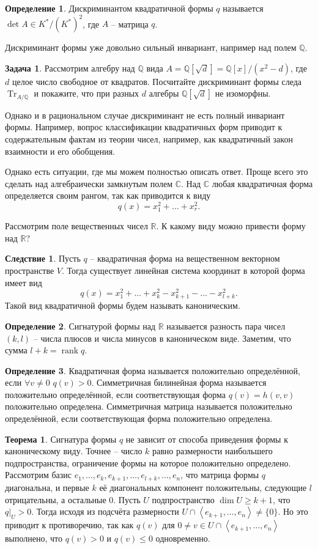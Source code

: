 \documentclass[10pt,a4paper,oneside]{book}
\theoremstyle{definition}
\newtheorem{zad}{Задача}
\newtheorem*{defn}{Определение}
\newtheorem{thm}{Теорема}
\newtheorem{cor}{Следствие}
\newcommand{\mb}[1]{\mathbb{#1}}
\newcommand{\rank}{\operatorname{rank}}
\newcommand{\tr}{\operatorname{Tr}}
\def\lan{\left\langle }
\def\ran{\right\rangle}
\def\thrm{\begin{thm}}
\def\ethrm{\end{thm}}
\def\dfn{\begin{defn}}
\def\edfn{\end{defn}}
\def\zd{\begin{zad}}
\def\ezd{\end{zad}}
\def\crl{\begin{cor}}
\def\ecrl{\end{cor}}
\begin{document}
\dfn Дискриминантом квадратичной формы $q$ называется $\det A \in K^*/(K^*)^2$, где $A$ -- матрица $q$.
\edfn

Дискриминант формы уже довольно сильный инвариант, например над полем $\mb Q$.

\zd Рассмотрим алгебру над $\mb Q$ вида $A=\mb Q[\sqrt{d}]= \mb Q[x]/(x^2-d)$, где $d$ целое число свободное от квадратов. Посчитайте дискриминант формы следа $\tr_{A/\mb Q}$ и покажите, что при разных $d$ алгебры $\mb Q[\sqrt{d}]$ не изоморфны.
\ezd

Однако и в рациональном случае дискриминант не есть полный инвариант формы. Например, вопрос классификации квадратичных форм приводит к содержательным фактам из теории чисел, например, как квадратичный закон взаимности и его обобщения.

Однако есть ситуации, где мы можем полностью описать ответ.
Проще всего это сделать над алгебраически замкнутым полем $\mb C$. Над $\mb C$ любая квадратичная форма определяется своим рангом, так как приводится к виду $$q(x)=x_1^2+\dots+x_r^2.$$


Рассмотрим поле вещественных чисел $\mb R$. К какому виду можно привести форму над $\mb R$? 

\crl Пусть $q$ -- квадратичная форма на вещественном векторном пространстве $V$. Тогда существует линейная система координат в которой форма имеет вид $$q(x)= x_1^2+\dots + x_k^2 - x_{k+1}^2-\dots-x_{l+k}^2.$$
Такой вид квадратичной формы будем называть каноническим. 
\ecrl

\dfn Сигнатурой формы над $\mb R$ называется разность пара чисел $(k, l)$ -- числа плюсов и числа минусов в каноническом виде. Заметим, что сумма $l+k= \rank q$.
\edfn

\dfn Квадратичная форма называется положительно определённой, если $\forall v\neq 0$ $q(v)>0$. Симметричная билинейная форма называется положительно определённой, если соответствующая форма $q(v)=h(v,v)$ положительно определена. Симметричная матрица называется положительно определённой, если соответствующая форма положительно определена.
\edfn



\thrm Сигнатура формы $q$ не зависит от способа приведения формы к каноническому виду. Точнее -- число $k$ равно размерности наибольшего подпространства, ограничение формы  на которое положительно определено.
\proof Рассмотрим базис $e_1,\dots,e_k,e_{k+1},\dots,e_{l+k}, \dots, e_n$, что матрица формы $q$ диагональна, и первые $k$ её диагональных компонент положительны, следующие $l$ отрицательны, а остальные 0. 
Пусть $U$ подпространство $\dim U \geq k+1$, что $q|_{U}>0$. Тогда исходя из подсчёта размерности $U\cap \lan e_{k+1},\dots,e_n\ran \neq \{0\}$. Но это приводит к противоречию, так как $q(v)$ для $0\neq v \in U\cap \lan e_{k+1},\dots,e_n\ran $ выполнено, что $q(v)>0$ и $q(v)\leq 0$ одновременно.
\endproof
\ethrm
\end{document}
